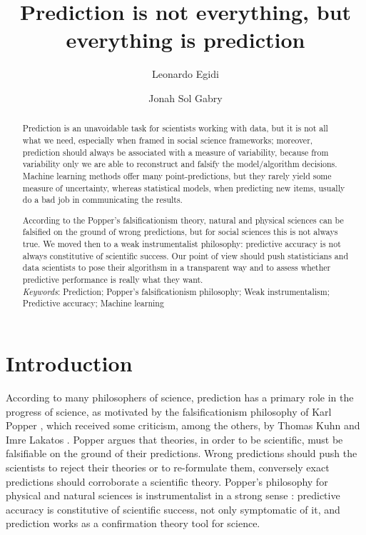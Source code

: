 \documentclass{statsoc}
\title[]{Prediction is not everything, but everything is prediction}
\author[Egidi and Gabry]{Leonardo Egidi}
\author[Egidi and Gabry]{Jonah Sol Gabry}
\begin{document}
\maketitle

\begin{abstract}
Prediction is an unavoidable task for scientists working 
with data, but it is not all what we need, especially when framed in social science frameworks; moreover, prediction should always be associated with a measure of variability, because from variability only we are able to reconstruct and 
falsify the model/algorithm decisions. Machine learning methods offer many point-predictions,  but they rarely yield some measure of uncertainty, whereas statistical 
models, when predicting new items, usually do a bad job in communicating the results.

According to the Popper's falsificationism theory, natural and physical sciences can be falsified on the ground of wrong predictions, but for social sciences this is not always true.
We moved then to a weak instrumentalist philosophy: predictive accuracy is not always constitutive of scientific success. Our point of view should push statisticians and data scientists to pose their algorithsm in a transparent way and to assess whether predictive performance is really what they want.\\

\emph{Keywords}: Prediction; Popper's falsificationism philosophy; Weak instrumentalism; Predictive accuracy; Machine learning

\end{abstract}

\section{Introduction}

According to many philosophers of science, prediction has a primary role in the progress of science, as motivated by the falsificationism philosophy of Karl Popper 
\citep{popper1934logic}, which received some criticism, among the others, by Thomas Kuhn \citep{kuhn1962structure} and Imre Lakatos \citep{lakatos1976falsification}. Popper argues 
that theories, in order to be scientific, must be falsifiable on the ground of their  predictions. Wrong predictions should push the scientists to reject their theories or to 
re-formulate them, conversely exact predictions should corroborate a scientific theory.  Popper's philosophy for physical and natural sciences is instrumentalist 
 in a strong sense \citep{hitchcock2004prediction}: predictive accuracy is constitutive of scientific success, not only symptomatic of it, and  prediction works as a confirmation theory tool for science. 
\end{document}
